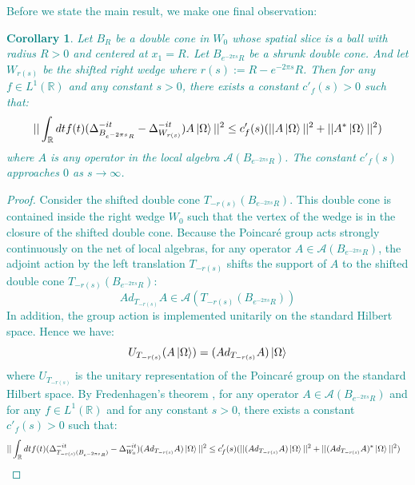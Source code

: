 \documentclass[a4paper,11pt]{article}
\newtheorem{corollary}[theorem]{Corollary}
\theoremstyle{definition}
\newcommand{\YC}[1]{\textcolor{teal}{#1}}
\begin{document}
\YC{
Before we state the main result, we make one final observation:
\begin{corollary}\label{corollary:extensionfredenhagen}
    Let $B_R$ be a double cone in $W_0$ whose spatial slice is a ball with radius $R > 0$ and centered at $x_1 = R$. Let $B_{e^{-2\pi s}R}$ be a shrunk double cone. And let $W_{r(s)}$ be the shifted right wedge where $r(s) := R - e^{-2\pi s}R$. Then for any $f\in L^1(\mathbb{R})$ and any constant $s > 0$, there exists a constant $c'_f(s) > 0$ such that:
    \begin{equation}
        ||\int_\mathbb{R} dt f(t) (\Delta^{-it}_{B_{e^{-2\pi s }R}} - \Delta_{W_{r(s)}}^{-it})A\ket{\Omega}||^2 \leq c'_f(s)(||A\ket{\Omega}||^2 + ||A^*\ket{\Omega}||^2)
    \end{equation}
    where $A$ is any operator in the local algebra $\mathcal{A}(B_{e^{-2\pi s}R})$. The constant $c'_f(s)$ approaches $0$ as $s\rightarrow \infty$.
\end{corollary}
\begin{proof}
    Consider the shifted double cone $T_{-r(s)}(B_{e^{-2\pi s}R})$. This double cone is contained inside the right wedge $W_0$ such that the vertex of the wedge is in the closure of the shifted double cone. Because the Poincaré group acts strongly continuously on the net of local algebras, for any operator $A\in \mathcal{A}(B_{e^{-2\pi s}R})$, the adjoint action by the left translation $T_{-r(s)}$ shifts the support of $A$ to the shifted double cone $T_{-r(s)}(B_{e^{-2\pi s}R})$:
    \begin{equation}
        Ad_{T_{-r(s)}}A\in\mathcal{A}(T_{-r(s)}(B_{e^{-2\pi s}R}))
    \end{equation}
    In addition, the group action is implemented unitarily on the standard Hilbert space. Hence we have:
    \begin{equation}
        U_{T_{-r(s)}}(A\ket{\Omega}) = (Ad_{T_{-r(s)}}A)\ket{\Omega}
    \end{equation}
    where $U_{T_{-r(s)}}$ is the unitary representation of the Poincaré group on the standard Hilbert space. By Fredenhagen's theorem \cite{fredenhagen}, for any operator $A\in \mathcal{A}(B_{e^{-2\pi s}R})$ and for any $f\in L^1(\mathbb{R})$ and for any constant $s > 0$, there exists a constant $c'_f(s) > 0$ such that:
    \begin{align}
        \begin{split}
            ||\int_\mathbb{R} dt f(t)(\Delta^{-it}_{T_{-r(s)}(B_{e^{-2\pi s}R})} - \Delta^{-it}_{W_0})(Ad_{T_{-r(s)}}A)\ket{\Omega}||^2 &\leq c'_f(s)(||(Ad_{T_{-r(s)}}A)\ket{\Omega}||^2 + ||(Ad_{T_{-r(s)}}A)^*\ket{\Omega}||^2)

\end{split}
\end{align}
\end{proof}}
\end{document}
